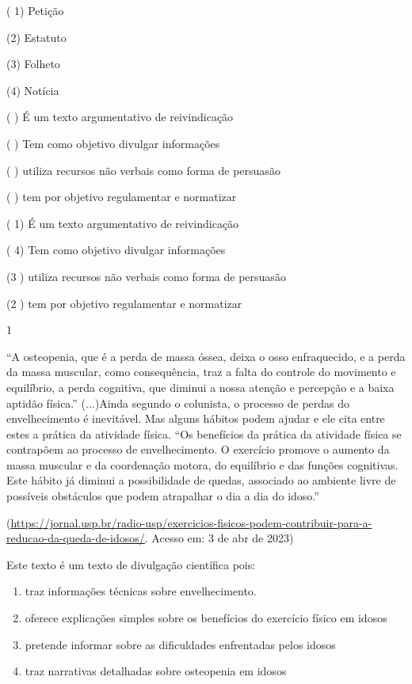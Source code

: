 {( 1) Petição

(2) Estatuto

(3) Folheto

(4) Notícia

( ) É um texto argumentativo de reivindicação

( ) Tem como objetivo divulgar informações

( ) utiliza recursos não verbais como forma de persuasão

( ) tem por objetivo regulamentar e normatizar

( 1) É um texto argumentativo de reivindicação

( 4) Tem como objetivo divulgar informações

(3 ) utiliza recursos não verbais como forma de persuasão

(2 ) tem por objetivo regulamentar e normatizar


\num{1}

``A osteopenia, que é a perda de massa óssea, deixa o osso enfraquecido,
e a perda da massa muscular, como consequência, traz a falta do controle
do movimento e equilíbrio, a perda cognitiva, que diminui a nossa
atenção e percepção e a baixa aptidão física.'' (...)Ainda segundo o
colunista, o processo de perdas do envelhecimento é inevitável. Mas
alguns hábitos podem ajudar e ele cita entre estes a prática da
atividade física. ``Os benefícios da prática da atividade física se
contrapõem ao processo de envelhecimento. O exercício promove o aumento
da massa muscular e da coordenação motora, do equilíbrio e das funções
cognitivas. Este hábito já diminui a possibilidade de quedas, associado
ao ambiente livre de possíveis obstáculos que podem atrapalhar o dia a
dia do idoso.''

(\href{https://jornal.usp.br/radio-usp/exercicios-fisicos-podem-contribuir-para-a-reducao-da-queda-de-idosos/}{\uline{https://jornal.usp.br/radio-usp/exercicios-fisicos-podem-contribuir-para-a-reducao-da-queda-de-idosos/}}.
Acesso em: 3 de abr de 2023)

Este texto é um texto de divulgação científica pois:

\begin{enumerate}
\def\labelenumi{\alph{enumi})}
\item
  traz informações técnicas sobre envelhecimento.
\item
  oferece explicações simples sobre os benefícios do exercício físico em
  idosos
\item
  pretende informar sobre as dificuldades enfrentadas pelos idosos
\item
  traz narrativas detalhadas sobre osteopenia em idosos
\end{enumerate}

}
